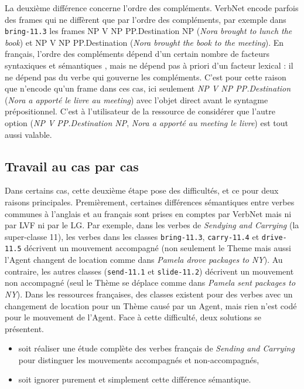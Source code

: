 La deuxième différence concerne l'ordre des compléments. VerbNet encode parfois
des frames qui ne diffèrent que par l'ordre des compléments, par exemple dans
{\color{blue}\texttt{bring-11.3}} les frames NP V NP PP.Destination NP
(\textit{Nora brought to lunch the book}) et NP V NP PP.Destination (\textit{Nora
brought the book to the meeting}). En français, l'ordre des compléments dépend
d'un certain nombre de facteurs syntaxiques et sémantiques
\citep{thuilier2012contraintes}, mais ne dépend pas à priori d'un facteur
lexical : il ne dépend pas du verbe qui gouverne les compléments. C'est pour
cette raison que \verbenet{} n'encode qu'un frame dans ces cas, ici seulement
\textit{NP V NP PP.Destination} (\textit{Nora a apporté le livre au meeting}) avec
l'objet direct avant le syntagme prépositionnel. C'est à l'utilisateur de la
ressource de considérer que l'autre option (\textit{NP V PP.Destination NP},
\textit{Nora a apporté au meeting le livre}) est tout aussi valable.

\subsection{Travail au cas par cas}\label{casebycase}

Dans certains cas, cette deuxième étape pose des difficultés, et ce pour deux
raisons principales. Premièrement, certaines différences sémantiques entre
verbes communes à l'anglais et au français sont prises en comptes par VerbNet
mais ni par LVF ni par le LG. Par exemple, dans les verbes de \textit{Sendying
and Carrying} (la super-classe 11), les verbes dans les classes
{\color{blue}\texttt{bring-11.3}}, {\color{blue}\texttt{carry-11.4}} et
{\color{blue}\texttt{drive-11.5}}
décrivent un mouvement accompagné (non seulement le Theme mais aussi l'Agent
changent de location comme dans \textit{Pamela drove packages to NY}). Au
contraire, les autres classes ({\color{blue}\texttt{send-11.1}} et
{\color{blue}\texttt{slide-11.2}}) décrivent un mouvement non accompagné (seul le Thème
se déplace comme dans \textit{Pamela sent packages to NY}). Dans les ressources
françaises, des classes existent pour des verbes avec un changement de location
pour un Thème causé par un Agent, mais rien n'est codé pour le mouvement de
l'Agent. Face à cette difficulté, deux solutions se présentent.

\begin{itemize}
    \item soit réaliser une étude complète des verbes français de \textit{Sending
        and Carrying} pour distinguer les mouvements accompagnés et
        non-accompagnés,
    \item soit ignorer purement et simplement cette différence sémantique.
\end{itemize}

